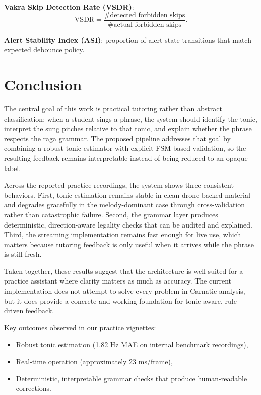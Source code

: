 \documentclass{ieeeaccess}
\begin{document}
\textbf{Vakra Skip Detection Rate (VSDR)}:
\begin{equation}
\text{VSDR} = \frac{\#\text{detected forbidden skips}}{\#\text{actual forbidden skips}}.
\end{equation}

\textbf{Alert Stability Index (ASI)}: proportion of alert state transitions that match expected debounce policy.

\section{Conclusion}
\label{sec:conclusion}

The central goal of this work is practical tutoring rather than abstract classification: when a student sings a phrase, the system should identify the tonic, interpret the sung pitches relative to that tonic, and explain whether the phrase respects the raga grammar. The proposed pipeline addresses that goal by combining a robust tonic estimator with explicit FSM-based validation, so the resulting feedback remains interpretable instead of being reduced to an opaque label.

Across the reported practice recordings, the system shows three consistent behaviors. First, tonic estimation remains stable in clean drone-backed material and degrades gracefully in the melody-dominant case through cross-validation rather than catastrophic failure. Second, the grammar layer produces deterministic, direction-aware legality checks that can be audited and explained. Third, the streaming implementation remains fast enough for live use, which matters because tutoring feedback is only useful when it arrives while the phrase is still fresh.

Taken together, these results suggest that the architecture is well suited for a practice assistant where clarity matters as much as accuracy. The current implementation does not attempt to solve every problem in Carnatic analysis, but it does provide a concrete and working foundation for tonic-aware, rule-driven feedback.

Key outcomes observed in our practice vignettes:
\begin{itemize}
\item Robust tonic estimation (1.82 Hz MAE on internal benchmark recordings),
\item Real-time operation (approximately 23 ms/frame),
\item Deterministic, interpretable grammar checks that produce human-readable corrections.
\end{itemize}
\end{document}
